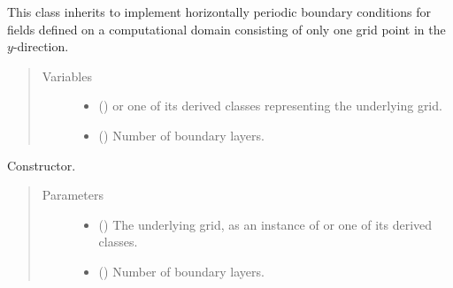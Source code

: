 \documentclass[letterpaper,10pt,english]{sphinxmanual}
\begin{document}
\begin{fulllineitems}
\label{\detokenize{api:dycore.horizontal_boundary_periodic.PeriodicXZ}}
This class inherits  to implement horizontally periodic boundary conditions for fields
defined on a computational domain consisting of only one grid point in the \(y\)-direction.
\begin{quote}\begin{description}
\item[{Variables}] \leavevmode\begin{itemize}
\item {} 
 () \textendash{}  or one of its derived classes representing the underlying grid.

\item {} 
{\hyperref[\detokenize{api:dycore.prognostic_isentropic.PrognosticIsentropic.nb}]{}} () \textendash{} Number of boundary layers.

\end{itemize}

\end{description}\end{quote}

\begin{fulllineitems}
\label{\detokenize{api:dycore.horizontal_boundary_periodic.PeriodicXZ.__init__}}
Constructor.
\begin{quote}\begin{description}
\item[{Parameters}] \leavevmode\begin{itemize}
\item {} 
 () \textendash{} The underlying grid, as an instance of {\hyperref[\detokenize{api:grids.grid_xyz.GridXYZ}]{}} or one of its derived classes.

\item {} 
 () \textendash{} Number of boundary layers.


\end{itemize}
\end{description}
\end{quote}
\end{fulllineitems}
\end{fulllineitems}
\end{document}

